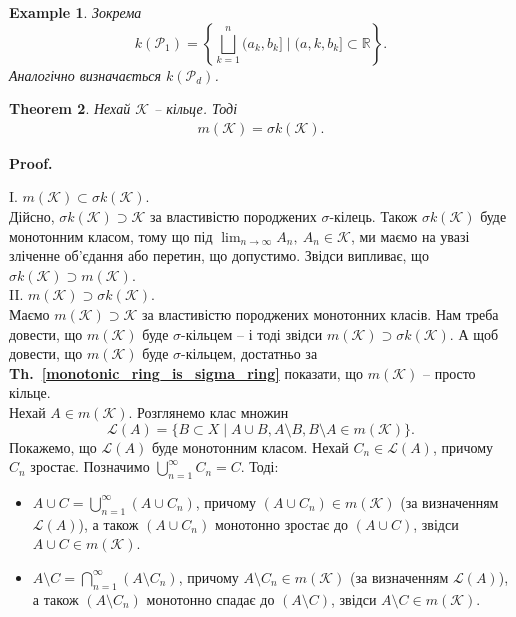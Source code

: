 \documentclass[a4paper, 10pt]{article}
\makeatletter
\theoremstyle{theoremdd}
\newtheorem{theorem}{Theorem}[subsection]
\newtheorem{example}[theorem]{Example}
\newcommand\thref[1]{\textbf{Th.~\ref{#1}}}
\renewenvironment{proof}[1][Proof.\\]{\par
\pushQED{\hfill \qed}%
\normalfont \topsep6\p@\@plus6\p@\relax
\trivlist
\item\relax
{\bfseries
#1\@addpunct{.}}\hspace\labelsep\ignorespaces
}{%
\popQED\endtrivlist\@endpefalse
}
\makeatother
\begin{document}
\begin{example}
Зокрема \[
k(\mathcal{P}_1) = \displaystyle\left\{ \bigsqcup_{k=1}^n (a_k,b_k] \mid (a,k,b_k] \subset \mathbb{R} \right\}.
\]
Аналогічно визначається $k(\mathcal{P}_d)$.
\end{example}

\begin{theorem}
\label{monotonic_class_generated_by_ring_is_sigma_ring_generated_by_ring}
Нехай $\mathcal{K}$ -- кільце. Тоді
\begin{align*}
m(\mathcal{K}) = \sigma k(\mathcal{K}).
\end{align*}
\end{theorem}

\begin{proof}
I. $m(\mathcal{K}) \subset \sigma k(\mathcal{K})$.\\
Дійсно, $\sigma k(\mathcal{K}) \supset \mathcal{K}$ за властивістю породжених $\sigma$-кілець. Також $\sigma k(\mathcal{K})$ буде монотонним класом, тому що під $\displaystyle\lim_{n \to \infty} A_n,\ A_n \in \mathcal{K}$, ми маємо на увазі зліченне об'єдання або перетин, що допустимо. Звідси випливає, що $\sigma k(\mathcal{K}) \supset m(\mathcal{K})$.
\bigskip \\
II. $m(\mathcal{K}) \supset \sigma k(\mathcal{K})$.\\
Маємо $m(\mathcal{K}) \supset \mathcal{K}$ за властивістю породжених монотонних класів. Нам треба довести, що $m(\mathcal{K})$ буде $\sigma$-кільцем -- і тоді звідси $m(\mathcal{K}) \supset \sigma k(\mathcal{K})$. А щоб довести, що $m(\mathcal{K})$ буде $\sigma$-кільцем, достатньо за \thref{monotonic_ring_is_sigma_ring} показати, що $m(\mathcal{K})$ -- просто кільце.\\
Нехай $A \in m(\mathcal{K})$. Розглянемо клас множин \[
\mathcal{L}(A) = \{B \subset X \mid A \cup B, A \setminus B, B \setminus A \in m(\mathcal{K})\}.
\]
Покажемо, що $\mathcal{L}(A)$ буде монотонним класом. Нехай $C_n \in \mathcal{L}(A)$, причому $C_n$ зростає. Позначимо $\displaystyle\bigcup_{n=1}^\infty C_n = C$. Тоді:
\begin{itemize}[nosep,wide=0pt]
\item $A \cup C = \displaystyle\bigcup_{n=1}^\infty (A \cup C_n)$, причому $(A \cup C_n) \in m(\mathcal{K})$ (за визначенням $\mathcal{L}(A)$), а також $(A \cup C_n)$ монотонно зростає до $(A \cup C)$, звідси $A \cup C \in m(\mathcal{K})$.
\item $A \setminus C = \displaystyle\bigcap_{n=1}^\infty (A \setminus C_n)$, причому $A \setminus C_n \in m(\mathcal{K})$ (за визначенням $\mathcal{L}(A)$), а також $(A \setminus C_n)$ монотонно спадає до $(A \setminus C)$, звідси $A \setminus C \in m(\mathcal{K})$.

\end{itemize}
\end{proof}
\end{document}
